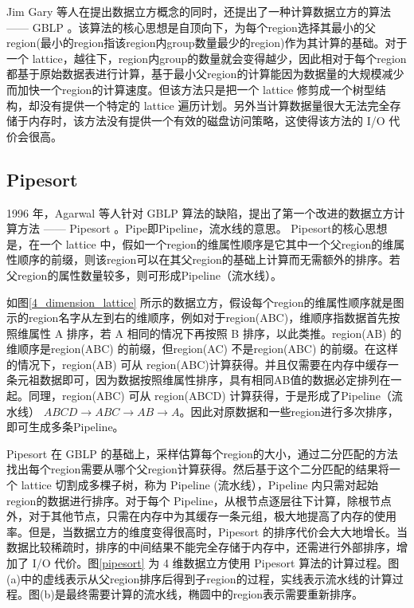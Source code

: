 Jim Gary 等人在提出数据立方概念的同时，还提出了一种计算数据立方的算法 —— GBLP \cite{gray1997data}。该算法的核心思想是自顶向下，为每个region选择其最小的父region(最小的region指该region内group数量最少的region)作为其计算的基础。对于一个 lattice，越往下，region内group的数量就会变得越少，因此相对于每个region都基于原始数据表进行计算，基于最小父region的计算能因为数据量的大规模减少而加快一个region的计算速度。但该方法只是把一个 lattice 修剪成一个树型结构，却没有提供一个特定的 lattice 遍历计划。另外当计算数据量很大无法完全存储于内存时，该方法没有提供一个有效的磁盘访问策略，这使得该方法的 I/O 代价会很高。

\subsection{Pipesort}

1996 年，Agarwal 等人针对 GBLP 算法的缺陷，提出了第一个改进的数据立方计算方法 —— Pipesort\cite{agarwal1996computation} 。Pipe即Pipeline，流水线的意思。
Pipesort的核心思想是，在一个 lattice 中，假如一个region的维属性顺序是它其中一个父region的维属性顺序的前缀，则该region可以在其父region的基础上计算而无需额外的排序。若父region的属性数量较多，则可形成Pipeline（流水线）。

如图\ref{4_dimension_lattice} 所示的数据立方，假设每个region的维属性顺序就是图示的region名字从左到右的维顺序，例如对于region(ABC)，维顺序指数据首先按照维属性 A 排序，若 A 相同的情况下再按照 B 排序，以此类推。region(AB) 的维顺序是region(ABC) 的前缀，但region(AC) 不是region(ABC) 的前缀。在这样的情况下，region(AB) 可从 region(ABC)计算获得。并且仅需要在内存中缓存一条元祖数据即可，因为数据按照维属性排序，具有相同AB值的数据必定排列在一起。同理，region(ABC) 可从 region(ABCD) 计算获得，于是形成了Pipeline（流水线） $ABCD\rightarrow ABC\rightarrow AB\rightarrow A$。因此对原数据和一些region进行多次排序，即可生成多条Pipeline。

Pipesort 在 GBLP 的基础上，采样估算每个region的大小，通过二分匹配的方法找出每个region需要从哪个父region计算获得。然后基于这个二分匹配的结果将一个 lattice 切割成多棵子树，称为 Pipeline (流水线），Pipeline 内只需对起始region的数据进行排序。对于每个 Pipeline，从根节点逐层往下计算，除根节点外，对于其他节点，只需在内存中为其缓存一条元组，极大地提高了内存的使用率。但是，当数据立方的维度变得很高时，Pipesort 的排序代价会大大地增长。当数据比较稀疏时，排序的中间结果不能完全存储于内存中，还需进行外部排序，增加了 I/O 代价。图\ref{pipesort} 为 4 维数据立方使用 Pipesort 算法的计算过程。图(a)中的虚线表示从父region排序后得到子region的过程，实线表示流水线的计算过程。图(b)是最终需要计算的流水线，椭圆中的region表示需要重新排序。


